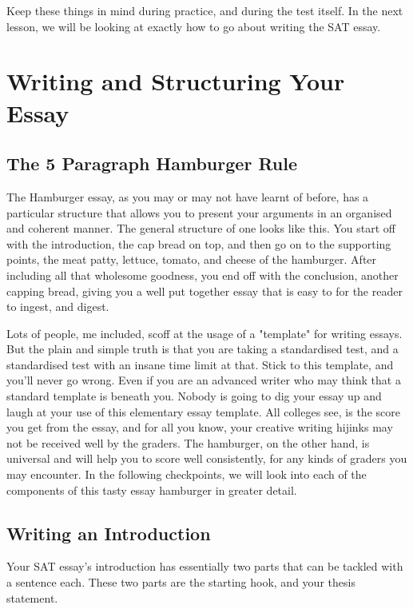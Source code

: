 \documentclass[DIV=calc,11pt,parskip,numbers=noenddot]{scrartcl} %
\begin{document}
Keep these things in mind during practice, and during the test itself. In the next lesson, we will be looking at exactly how to go about writing the SAT essay.
\section{Writing and Structuring Your Essay}
\subsection{The 5 Paragraph Hamburger Rule}
The Hamburger essay, as you may or may not have learnt of before, has a particular structure that allows you to present your arguments in an organised and coherent manner. The general structure of one looks like this. You start off with the introduction, the cap bread on top, and then go on to the supporting points, the meat patty, lettuce, tomato, and cheese of the hamburger. After including all that wholesome goodness, you end off with the conclusion, another capping bread, giving you a well put together essay that is easy to for the reader to ingest, and digest.

Lots of people, me included, scoff at the usage of a "template" for writing essays. But the plain and simple truth is that you are taking a standardised test, and a standardised test with an insane time limit at that. Stick to this template, and you’ll never go wrong. Even if you are an advanced writer who may think that a standard template is beneath you. Nobody is going to dig your essay up and laugh at your use of this elementary essay template. All colleges see, is the score you get from the essay, and for all you know, your creative writing hijinks may not be received well by the graders. The hamburger, on the other hand, is universal and will help you to score well consistently, for any kinds of graders you may encounter. In the following checkpoints, we will look into each of the components of this tasty essay hamburger in greater detail.
\subsection{Writing an Introduction}
Your SAT essay’s introduction has essentially two parts that can be tackled with a sentence each. These two parts are the starting hook, and your thesis statement.
\end{document}
